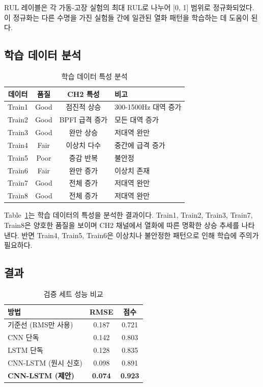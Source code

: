 \documentclass[conference,twocolumn]{IEEEtran}
\begin{document}
RUL 레이블은 각 가동-고장 실험의 최대 RUL로 나누어 [0, 1] 범위로 정규화되었다. 이 정규화는 다른 수명을 가진 실험들 간에 일관된 열화 패턴을 학습하는 데 도움이 된다.

\subsection{학습 데이터 분석}

\begin{table}[t]
\centering
\caption{학습 데이터 특성 분석}
\label{tab:data_analysis}
\begin{tabular}{cccp{3cm}}
\toprule
\textbf{데이터} & \textbf{품질} & \textbf{CH2 특성} & \textbf{비고} \\
\midrule
Train1 & Good & 점진적 상승 & 300-1500Hz 대역 증가 \\
Train2 & Good & BPFI 급격 증가 & 모든 대역 증가 \\
Train3 & Good & 완만 상승 & 저대역 완만 \\
Train4 & Fair & 이상치 다수 & 중간에 급격 증가 \\
Train5 & Poor & 증감 반복 & 불안정 \\
Train6 & Fair & 완만 증가 & 이상치 존재 \\
Train7 & Good & 전체 증가 & 저대역 완만 \\
Train8 & Good & 전체 증가 & 저대역 완만 \\
\bottomrule
\end{tabular}
\end{table}

Table~\ref{tab:data_analysis}는 학습 데이터의 특성을 분석한 결과이다. Train1, Train2, Train3, Train7, Train8은 양호한 품질을 보이며 CH2 채널에서 열화에 따른 명확한 상승 추세를 나타낸다. 반면 Train4, Train5, Train6은 이상치나 불안정한 패턴으로 인해 학습에 주의가 필요하다.

\subsection{결과}

\begin{table}[t]
\centering
\caption{검증 세트 성능 비교}
\label{tab:results}
\begin{tabular}{lcc}
\toprule
\textbf{방법} & \textbf{RMSE} & \textbf{점수} \\
\midrule
기준선 (RMS만 사용) & 0.187 & 0.721 \\
CNN 단독 & 0.142 & 0.803 \\
LSTM 단독 & 0.128 & 0.835 \\
CNN-LSTM (원시 신호) & 0.098 & 0.891 \\
\textbf{CNN-LSTM (제안)} & \textbf{0.074} & \textbf{0.923} \\
\bottomrule
\end{tabular}
\end{table}
\end{document}

